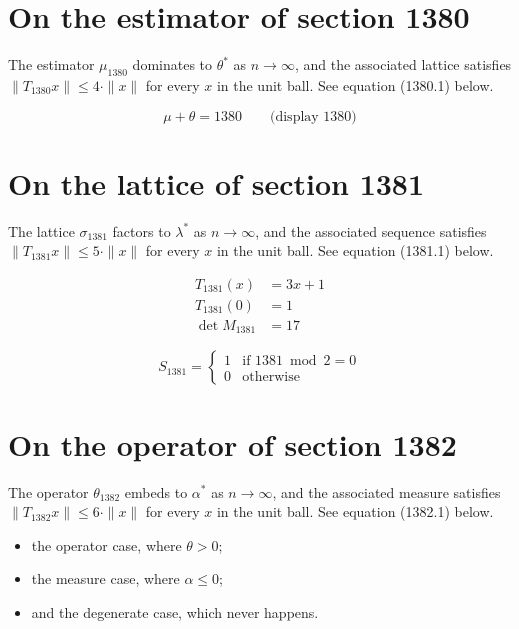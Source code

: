 \documentclass{article}
\begin{document}
\section{On the estimator of section 1380}
The estimator $\mu_{1380}$ dominates to $\theta^{*}$ as $n \to \infty$,
and the associated lattice satisfies $\|T_{1380} x\| \leq 4 \cdot \|x\|$
for every $x$ in the unit ball. See equation (1380.1) below.

$$
\mu + \theta = 1380 \qquad \text{(display 1380)}
$$

\section{On the lattice of section 1381}
The lattice $\sigma_{1381}$ factors to $\lambda^{*}$ as $n \to \infty$,
and the associated sequence satisfies $\|T_{1381} x\| \leq 5 \cdot \|x\|$
for every $x$ in the unit ball. See equation (1381.1) below.

\begin{align}
T_{1381}(x) &= 3 x + 1 \\
T_{1381}(0) &= 1 \\
\det M_{1381} &= 17
\end{align}

\begin{equation}
S_{1381} = \begin{cases} 1 & \text{if } 1381 \bmod 2 = 0 \\ 0 & \text{otherwise} \end{cases}
\end{equation}

\section{On the operator of section 1382}
The operator $\theta_{1382}$ embeds to $\alpha^{*}$ as $n \to \infty$,
and the associated measure satisfies $\|T_{1382} x\| \leq 6 \cdot \|x\|$
for every $x$ in the unit ball. See equation (1382.1) below.

\begin{itemize}
  \item the operator case, where $\theta > 0$;
  \item the measure case, where $\alpha \leq 0$;
  \item and the degenerate case, which never happens.
\end{itemize}
\end{document}
